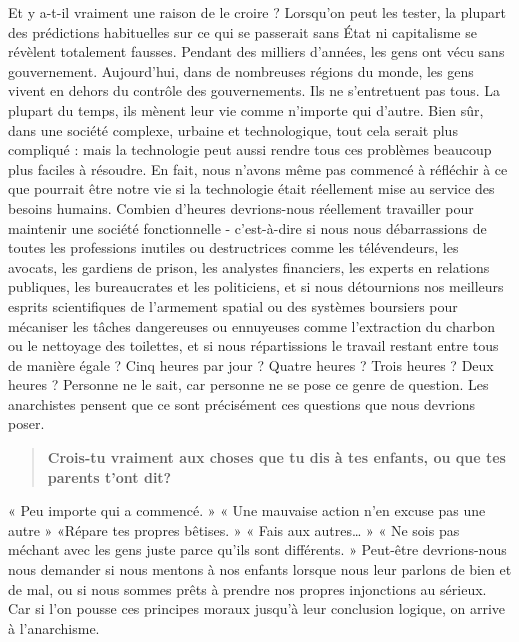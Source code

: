 Et y a-t-il vraiment une raison de le croire ? Lorsqu'on peut les tester, la plupart des prédictions habituelles sur ce qui se passerait sans État ni capitalisme se révèlent totalement fausses. Pendant des milliers d'années, les gens ont vécu sans gouvernement. Aujourd'hui, dans de nombreuses régions du monde, les gens vivent en dehors du contrôle des gouvernements. Ils ne s'entretuent pas tous. La plupart du temps, ils mènent leur vie comme n'importe qui d'autre. Bien sûr, dans une société complexe, urbaine et technologique, tout cela serait plus compliqué : mais la technologie peut aussi rendre tous ces problèmes beaucoup plus faciles à résoudre. En fait, nous n'avons même pas commencé à réfléchir à ce que pourrait être notre vie si la technologie était réellement mise au service des besoins humains. Combien d'heures devrions-nous réellement travailler pour maintenir une société fonctionnelle - c'est-à-dire si nous nous débarrassions de toutes les professions inutiles ou destructrices comme les télévendeurs, les avocats, les gardiens de prison, les analystes financiers, les experts en relations publiques, les bureaucrates et les politiciens, et si nous détournions nos meilleurs esprits scientifiques de l'armement spatial ou des systèmes boursiers pour mécaniser les tâches dangereuses ou ennuyeuses comme l'extraction du charbon ou le nettoyage des toilettes, et si nous répartissions le travail restant entre tous de manière égale ? Cinq heures par jour ? Quatre heures ? Trois heures ? Deux heures ? Personne ne le sait, car personne ne se pose ce genre de question. Les anarchistes pensent que ce sont précisément ces questions que nous devrions poser.

\begin{quotation}
\textbf{Crois-tu vraiment aux choses que tu dis à tes enfants, ou que tes parents t’ont dit?}
\end{quotation}

« Peu importe qui a commencé. » « Une mauvaise action n'en excuse pas une autre » «Répare tes propres bêtises. » « Fais aux autres… » « Ne sois pas méchant avec les gens juste parce qu'ils sont différents. » Peut-être devrions-nous nous demander si nous mentons à nos enfants lorsque nous leur parlons de bien et de mal, ou si nous sommes prêts à prendre nos propres injonctions au sérieux. Car si l'on pousse ces principes moraux jusqu'à leur conclusion logique, on arrive à l'anarchisme.

